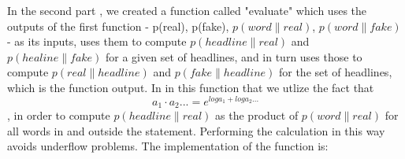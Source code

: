 \documentclass{article}
\begin{document}
\item 
In the second part , we created a function called "evaluate" which uses the outputs of the first function -  p(real), p(fake), $p(word\|real)$, $p(word\|fake)$ - as its inputs, uses them to compute $p(headline\|real)$ and $p(healine\|fake)$ for a given
set of headlines, and in turn uses those to compute $p(real\|headline)$ and $p(fake\|headline)$ for the set of headlines, which is the function output. In in this function that we utlize the fact that \begin{equation}a_1 \cdot a_2 ...=  e^{log{a_1} + log{a_2} ...} \end{equation}, in order to compute 
$p(headline\|real)$ as the product of $p(word\|real)$ for all words in and outside the statement. Performing the calculation in this way avoids underflow problems.
The implementation of the function is:
\end{document}
